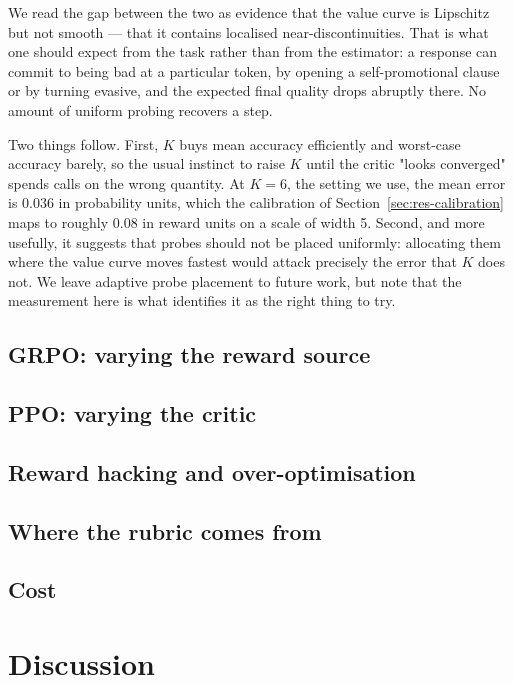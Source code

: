 \documentclass[11pt]{article}
\begin{document}
We read the gap between the two as evidence that the value curve is Lipschitz
but not smooth --- that it contains localised near-discontinuities. That is what
one should expect from the task rather than from the estimator: a response can
commit to being bad at a particular token, by opening a self-promotional
clause or by turning evasive, and the expected final quality drops abruptly
there. No amount of uniform probing recovers a step.

Two things follow. First, $K$ buys mean accuracy efficiently and worst-case
accuracy barely, so the usual instinct to raise $K$ until the critic "looks
converged" spends calls on the wrong quantity. At $K=6$, the setting we use,
the mean error is 0.036 in probability units, which the calibration of
Section~\ref{sec:res-calibration} maps to roughly 0.08 in reward units on a
scale of width 5. Second, and more usefully, it suggests that probes should not
be placed uniformly: allocating them where the value curve moves fastest would
attack precisely the error that $K$ does not. We leave adaptive probe placement
to future work, but note that the measurement here is what identifies it as the
right thing to try.

\subsection{GRPO: varying the reward source}


\subsection{PPO: varying the critic}


\subsection{Reward hacking and over-optimisation}


\subsection{Where the rubric comes from}


\subsection{Cost}


\section{Discussion}
\end{document}
